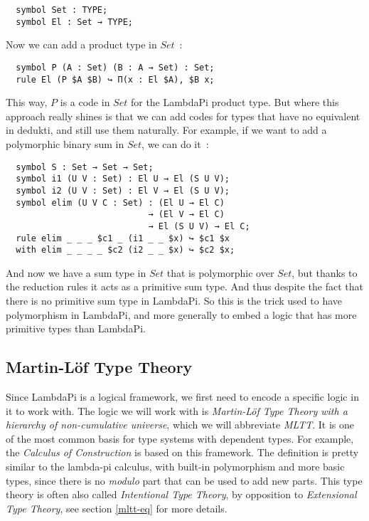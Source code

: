 \begin{lstlisting}
  symbol Set : TYPE;
  symbol El : Set → TYPE;
\end{lstlisting}

Now we can add a product type in $Set$~:

\begin{lstlisting}
  symbol P (A : Set) (B : A → Set) : Set;
  rule El (P $A $B) ↪ Π(x : El $A), $B x;
\end{lstlisting}

This way, $P$ is a code in $Set$ for the LambdaPi product type. But where this
approach really shines is that we can add codes for types that have no
equivalent in dedukti, and still use them naturally. For example, if we want to
add a polymorphic binary sum in $Set$, we can do it~:

\begin{lstlisting}
  symbol S : Set → Set → Set;
  symbol i1 (U V : Set) : El U → El (S U V);
  symbol i2 (U V : Set) : El V → El (S U V);
  symbol elim (U V C : Set) : (El U → El C)
                            → (El V → El C)
                            → El (S U V) → El C;
  rule elim _ _ _ $c1 _ (i1 _ _ $x) ↪ $c1 $x
  with elim _ _ _ _ $c2 (i2 _ _ $x) ↪ $c2 $x;
\end{lstlisting}

And now we have a sum type in $Set$ that is polymorphic over $Set$, but thanks
to the reduction rules it acts as a primitive sum type. And thus despite the
fact that there is no primitive sum type in LambdaPi. So this is the trick used
to have polymorphism in LambdaPi, and more generally to embed a logic that has
more primitive types than LambdaPi.

\subsection{Martin-Löf Type Theory}

Since LambdaPi is a logical framework, we first need to encode a specific logic
in it to work with. The logic we will work with is \emph{Martin-Löf Type Theory
with a hierarchy of non-cumulative universe}, which we will abbreviate
\emph{MLTT}. It is one of the most common basis for type systems with dependent
types. For example, the \emph{Calculus of Construction} is based on this
framework. The definition is pretty similar to the lambda-pi calculus, with
built-in polymorphism and more basic types, since there is no \emph{modulo} part
that can be used to add new parts. This type theory is often also called
\emph{Intentional Type Theory}, by opposition to \emph{Extensional Type Theory},
see section \ref{mltt-eq} for more details.

